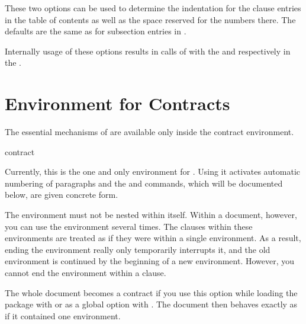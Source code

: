 \begin{Declaration}
\end{Declaration}
These two options can be used to determine the indentation for the clause
entries in the table of contents as well as the space reserved for the numbers
there. The defaults are the same as for subsection entries in
.

Internally usage of these options results
in calls of
with the   and 
respectively  in the .%
\EndIndexGroup


\section{Environment for Contracts}

\BeginIndexGroup
{}
The essential mechanisms of  are available only inside the
contract environment.

\begin{Declaration}
  \begin{Environment}{contract}\end{Environment}
\end{Declaration}
Currently, this is the one and only environment for . Using
it activates automatic numbering of paragraphs and the
 and 
commands, which will be documented below, are given concrete form.

The  environment must
not be nested within itself. Within a document, however, you can use the
environment several times. The clauses within these environments are treated
as if they were within a single environment. As a result, ending the
environment really only temporarily interrupts it, and the old environment is
continued by the beginning of a new environment. However, you cannot end the
environment within a clause.%
\EndIndexGroup


\begin{Declaration}
\end{Declaration}
The whole document becomes a contract if you use this option while loading the
package with %
 or as a global option with
%
. The document then behaves
exactly as if it contained one  environment.

